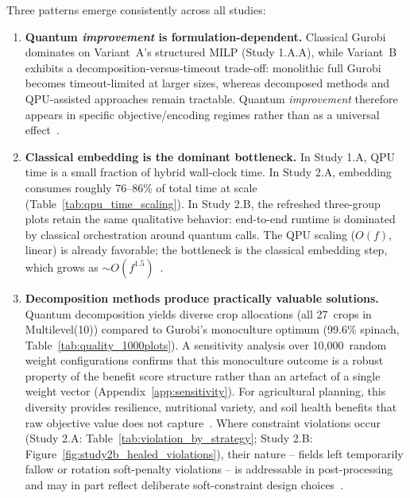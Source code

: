 \documentclass{oqireport}
\begin{document}
Three patterns emerge consistently across all studies:

\begin{enumerate}
    \item \textbf{Quantum \textit{improvement} is formulation-dependent.} Classical Gurobi dominates on Variant~A's structured MILP (Study 1.A.A), while Variant~B exhibits a decomposition-versus-timeout trade-off: monolithic full Gurobi becomes timeout-limited at larger sizes, whereas decomposed methods and QPU-assisted approaches remain tractable. Quantum \textit{improvement} therefore appears in specific objective/encoding regimes rather than as a universal effect~\cite{barahona1982computational, lucasIsingFormulationsMany2014}.

    \item \textbf{Classical embedding is the dominant bottleneck.} In Study 1.A, QPU time is a small fraction of hybrid wall-clock time. In Study 2.A, embedding consumes roughly 76--86\% of total time at scale (Table~\ref{tab:qpu_time_scaling}). In Study 2.B, the refreshed three-group plots retain the same qualitative behavior: end-to-end runtime is dominated by classical orchestration around quantum calls. The QPU scaling ($O(f)$, linear) is already favorable; the bottleneck is the classical embedding step, which grows as $\sim O(f^{1.5})$~\cite{zbinden2020embedding}.

    \item \textbf{Decomposition methods produce practically valuable solutions.} Quantum decomposition yields diverse crop allocations (all 27~crops in Multilevel(10)) compared to Gurobi's monoculture optimum (99.6\% spinach, Table~\ref{tab:quality_1000plots}). A sensitivity analysis over 10,000~random weight configurations confirms that this monoculture outcome is a robust property of the benefit score structure rather than an artefact of a single weight vector (Appendix~\ref{app:sensitivity}). For agricultural planning, this diversity provides resilience, nutritional variety, and soil health benefits that raw objective value does not capture~\cite{lin2011resilience, bowles2020longterm}. Where constraint violations occur (Study 2.A: Table~\ref{tab:violation_by_strategy}; Study 2.B: Figure~\ref{fig:study2b_healed_violations}), their nature -- fields left temporarily fallow or rotation soft-penalty violations -- is addressable in post-processing and may in part reflect deliberate soft-constraint design choices~\cite{dury2012cropping, hobbs2008conservation}.
\end{enumerate}
\end{document}
